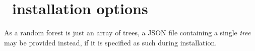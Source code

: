 \chapter{\where~installation options}
\thispagestyle{nohead}
\label{App:install}


As a random forest is just an array of trees, a JSON file containing a single \textit{tree} may be provided instead, if it is specified as such during installation.